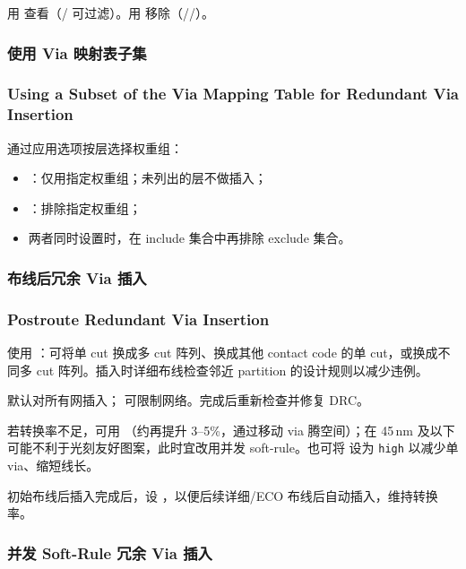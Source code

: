 用  查看（/ 可过滤）。用  移除（//）。

\subsubsection{使用 Via 映射表子集}
\subsubsection*{Using a Subset of the Via Mapping Table for Redundant Via Insertion}

通过应用选项按层选择权重组：
\begin{itemize}
  \item {}：仅用指定权重组；未列出的层不做插入；
  \item {}：排除指定权重组；
  \item 两者同时设置时，在 include 集合中再排除 exclude 集合。
\end{itemize}

\subsubsection{布线后冗余 Via 插入}
\subsubsection*{Postroute Redundant Via Insertion}

使用 ：可将单 cut 换成多 cut 阵列、换成其他 contact code 的单 cut，或换成不同多 cut 阵列。插入时详细布线检查邻近 partition 的设计规则以减少违例。

默认对所有网插入； 可限制网络。完成后重新检查并修复 DRC。

若转换率不足，可用 （约再提升 3--5\%，通过移动 via 腾空间）；在 45\,nm 及以下可能不利于光刻友好图案，此时宜改用并发 soft-rule。也可将  设为 \texttt{high} 以减少单 via、缩短线长。

初始布线后插入完成后，设 ，以便后续详细/ECO 布线后自动插入，维持转换率。

\subsubsection{并发 Soft-Rule 冗余 Via 插入}
